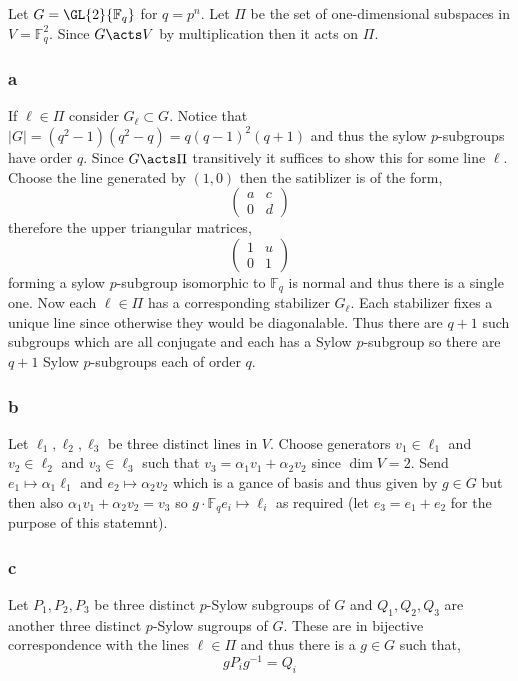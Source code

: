 \documentclass[12pt]{article}
\renewcommand{\F}{\mathbb{F}}
\begin{document}
Let $G = \GL{2}{\F_q}$ for $q = p^n$. Let $\Pi$ be the set of one-dimensional subspaces in $V = \F_q^2$. Since $G \acts V$ by multiplication then it acts on $\Pi$.

\subsubsection{a}

If $\ell \in \Pi$ consider $G_\ell \subset G$. Notice that $|G| = (q^2 - 1)(q^2 - q) = q(q-1)^2 (q+1)$ and thus the sylow $p$-subgroups have order $q$. Since $G \acts \Pi$ transitively it suffices to show this for some line $\ell$. Choose the line generated by $(1,0)$ then the satiblizer is of the form,
\[ \begin{pmatrix}
a & c 
\\
0 & d 
\end{pmatrix} \]
therefore the upper triangular matrices,
\[ \begin{pmatrix}
1 & u
\\
0 & 1
\end{pmatrix} \]
forming a sylow $p$-subgroup isomorphic to $\F_q$ is normal and thus there is a single one. Now each $\ell \in \Pi$ has a corresponding stabilizer $G_\ell$. Each stabilizer fixes a unique line since otherwise they would be diagonalable. Thus there are $q+1$ such subgroups which are all conjugate and each has a Sylow $p$-subgroup so there are $q + 1$ Sylow $p$-subgroups each of order $q$.

\subsubsection{b}

Let $\ell_1, \ell_2, \ell_3$ be three distinct lines in $V$. Choose generators $v_1 \in \ell_1$ and $v_2 \in \ell_2$ and $v_3 \in \ell_3$ such that $v_3 = \alpha_1 v_1 + \alpha_2 v_2$ since $\dim{V} = 2$. Send $e_1 \mapsto \alpha_1 \ell_1$ and $e_2 \mapsto \alpha_2 v_2$ which is a gance of basis and thus given by $g \in G$ but then also $\alpha_1 v_1 + \alpha_2 v_2 = v_3$ so $g \cdot \F_q e_i \mapsto \ell_i$ as required (let $e_3 = e_1 + e_2$ for the purpose of this statemnt). 

\subsubsection{c}

Let $P_1, P_2, P_3$ be three distinct $p$-Sylow subgroups of $G$ and $Q_1, Q_2, Q_3$ are another three distinct $p$-Sylow sugroups of $G$. These are in bijective correspondence with the lines $\ell \in \Pi$ and thus there is a $g \in G$ such that,
\[ g P_i g^{-1} = Q_i \]
\end{document}
